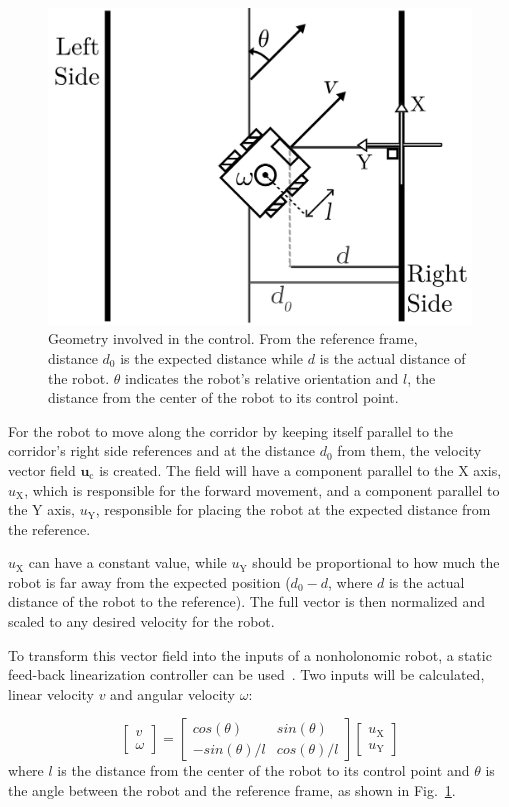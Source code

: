 \documentclass[twocolumn]{svjour3}       %
\begin{document}
\begin{figure}[h]
	\centering
	\includegraphics[width=0.8\linewidth]{Figures/navigation.pdf}    %
	\caption{Geometry involved in the control. From the reference frame, distance ${d_\text{0}}$ is the expected distance while ${d}$ is the actual distance of the robot. $\theta$ indicates the robot's relative orientation and $l$, the distance from the center of the robot to its control point.}
	\label{fig:navigation}
\end{figure}

For the robot to move along the corridor by keeping itself parallel to the corridor's right side references and at the distance $d_0$ from them, the velocity vector field $\mathbf{u}_\text{c}$ is created. The field will have a component parallel to the X axis, $u_\text{X}$, which is responsible for the forward movement, and a component parallel to the Y axis, $u_\text{Y}$, responsible for placing the robot at the expected distance from the reference.

$u_\text{X}$ can have a constant value, while  $u_\text{Y}$ should be proportional to how much the robot is far away from the expected position (${d_\text{0}-d}$, where $d$ is the actual distance of the robot to the reference). The full vector is then normalized and scaled to any desired velocity for the robot.

To transform this vector field into the inputs of a nonholonomic robot, a static feed-back linearization controller can be used~\citep{d1995control}. Two inputs will be calculated, linear velocity $v$ and angular velocity $\omega$:

\begin{equation}
    \begin{bmatrix} v \\ \omega \end{bmatrix} = \begin{bmatrix} cos(\theta) & sin (\theta) \\ -sin (\theta)/l & cos (\theta)/l \end{bmatrix} 		\begin{bmatrix} u_\text{X} \\ u_\text{Y} \end{bmatrix} 
    \label{eq:transformation}
\end{equation}
%
where $l$ is the distance from the center of the robot to its control point and $\theta$ is the angle between the robot and the reference frame, as shown in Fig.~\ref{fig:navigation}.
\end{document}
